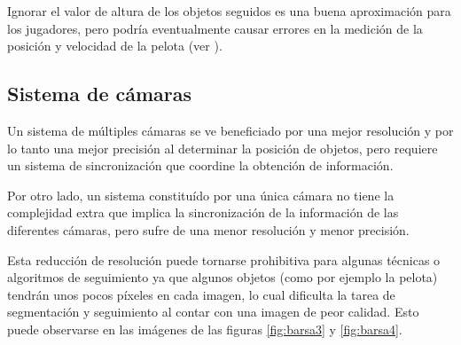 Ignorar el valor de altura de los objetos seguidos es una buena aproximación
para los jugadores, pero podría eventualmente causar errores en la medición de
la posición y velocidad de la pelota (ver \cite{Liu20061146}).

\subsection{Sistema de cámaras}
\label{sub-sec:camaras}

Un sistema de múltiples cámaras se ve beneficiado por una mejor resolución y
por lo tanto una mejor precisión al determinar la posición de objetos, pero
requiere un sistema de sincronización que coordine la obtención de información.

Por otro lado, un sistema constituído por una única cámara no tiene la
complejidad extra que implica la sincronización de la información de las
diferentes cámaras, pero sufre de una menor resolución y menor precisión.

Esta reducción de resolución puede tornarse prohibitiva para algunas técnicas o
algoritmos de seguimiento ya que algunos objetos (como por ejemplo la pelota)
tendrán unos pocos píxeles en cada imagen, lo cual dificulta la tarea de
segmentación y seguimiento al contar con una imagen de peor calidad.  Esto
puede observarse en las imágenes de las figuras \ref{fig:barsa3} y
\ref{fig:barsa4}.

